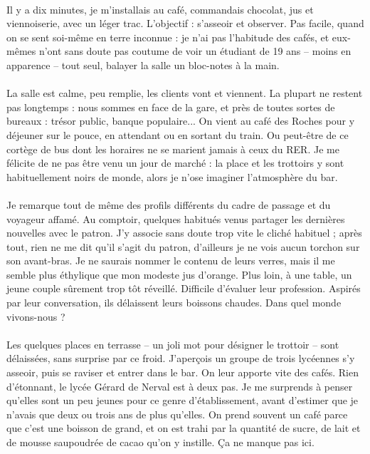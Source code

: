 \paragraph{}
Il y a dix minutes, je m’installais au café, commandais chocolat, jus et viennoiserie, avec un léger trac. L’objectif : s’asseoir et observer. Pas facile, quand on se sent soi-même en terre inconnue : je n’ai pas l’habitude des cafés, et eux-mêmes n’ont sans doute pas coutume de voir un étudiant de 19 ans – moins en apparence – tout seul, balayer la salle un bloc-notes à la main.

\paragraph{}
La salle est calme, peu remplie, les clients vont et viennent. La plupart ne restent pas longtemps : nous sommes en face de la gare, et près de toutes sortes de bureaux : trésor public, banque populaire... On vient au café des Roches pour y déjeuner sur le pouce, en attendant ou en sortant du train. Ou peut-être de ce cortège de bus dont les horaires ne se marient jamais à ceux du RER. Je me félicite de ne pas être venu un jour de marché : la place et les trottoirs y sont habituellement noirs de monde, alors je n’ose imaginer l’atmosphère du bar.

\paragraph{}
Je remarque tout de même des profils différents du cadre de passage et du voyageur affamé. Au comptoir, quelques habitués venus partager les dernières nouvelles avec le patron. J’y associe sans doute trop vite le cliché habituel ; après tout, rien ne me dit qu’il s’agit du patron, d’ailleurs je ne vois aucun torchon sur son avant-bras. Je ne saurais nommer le contenu de leurs verres, mais il me semble plus éthylique que mon modeste jus d’orange. Plus loin, à une table, un jeune couple sûrement trop tôt réveillé. Difficile d’évaluer leur profession. Aspirés par leur conversation, ils délaissent leurs boissons chaudes. Dans quel monde vivons-nous ?

\paragraph{}
Les quelques places en terrasse – un joli mot pour désigner le trottoir – sont délaissées, sans surprise par ce froid.  J’aperçois un groupe de trois lycéennes s’y asseoir, puis se raviser et entrer dans le bar. On leur apporte vite des cafés. Rien d’étonnant, le lycée Gérard de Nerval est à deux pas. Je me surprends à penser qu’elles sont un peu jeunes pour ce genre d’établissement, avant d’estimer que je n’avais que deux ou trois ans de plus qu’elles. On prend souvent un café parce que c’est une boisson de grand, et on est trahi par la quantité de sucre, de lait et de mousse saupoudrée de cacao qu’on y instille. Ça ne manque pas ici.

